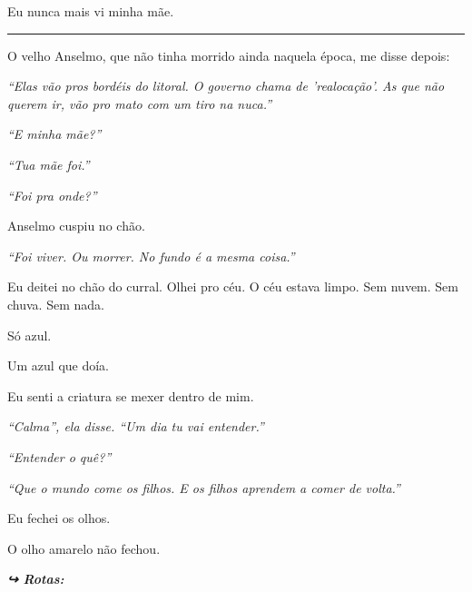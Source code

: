 \noindent Eu nunca mais vi minha mãe.

\vspace{0.5em}\noindent\rule{\textwidth}{0.5pt}\vspace{0.5em}

\noindent O velho Anselmo, que não tinha morrido ainda naquela época, me disse depois:

\noindent \textit{\textquotedblleft{}Elas vão pros bordéis do litoral. O governo chama de 'realocação'. As que não querem ir, vão pro mato com um tiro na nuca.\textquotedblright{}}

\noindent \textit{\textquotedblleft{}E minha mãe?\textquotedblright{}}

\noindent \textit{\textquotedblleft{}Tua mãe foi.\textquotedblright{}}

\noindent \textit{\textquotedblleft{}Foi pra onde?\textquotedblright{}}

\noindent Anselmo cuspiu no chão.

\noindent \textit{\textquotedblleft{}Foi viver. Ou morrer. No fundo é a mesma coisa.\textquotedblright{}}

\noindent Eu deitei no chão do curral. Olhei pro céu. O céu estava limpo. Sem nuvem. Sem chuva. Sem nada.

\noindent Só azul.

\noindent Um azul que doía.

\noindent Eu senti a criatura se mexer dentro de mim.

\noindent \textit{\textquotedblleft{}Calma\textquotedblright{}\textit{, ela disse. }\textquotedblleft{}Um dia tu vai entender.\textquotedblright{}}

\noindent \textit{\textquotedblleft{}Entender o quê?\textquotedblright{}}

\noindent \textit{\textquotedblleft{}Que o mundo come os filhos. E os filhos aprendem a comer de volta.\textquotedblright{}}

\noindent Eu fechei os olhos.

\noindent O olho amarelo não fechou.

\vspace{0.5em}
\noindent\textit{\textbf{↪ Rotas:}  \rotasep {} \rotasep {} \rotasep {}}